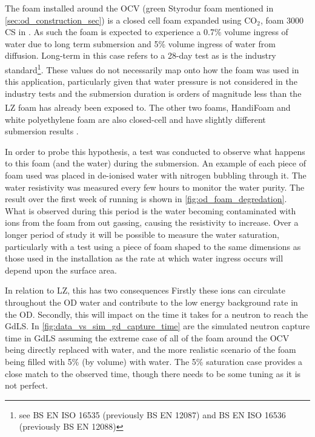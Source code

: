 \par
The foam installed around the OCV (green Styrodur foam mentioned in \autoref{sec:od_construction_sec}) is a closed cell foam expanded using CO$_2$, foam 3000 CS in \cite{styrodur_water_ingress_ref}.
As such the foam is expected to experience a 0.7\% volume ingress of water due to long term submersion and 5\% volume ingress of water from diffusion.
Long-term in this case refers to a 28-day test as is the industry standard\footnote{see BS EN ISO 16535 (previously BS EN 12087) and BS EN ISO 16536 (previously BS EN 12088)}.
These values do not necessarily map onto how the foam was used in this application, particularly given that water pressure is not considered in the industry tests and the submersion duration is orders of magnitude less than the LZ foam has already been exposed to.
The other two foams, HandiFoam\textsuperscript{\textregistered} and white polyethylene foam are also closed-cell and have slightly different submersion results
\cite{handifoam_water_ingress_ref, white_foam_ref}. 
\par
In order to probe this hypothesis, a test was conducted to observe what happens to this foam (and the water) during the submersion.
An example of each piece of foam used was placed in de-ionised water with nitrogen bubbling through it. 
The water resistivity was measured every few hours to monitor the water purity.
The result over the first week of running is shown in \autoref{fig:od_foam_degredation}.
What is observed during this period is the water becoming contaminated with ions from the foam from out gassing, causing the resistivity to increase.
Over a longer period of study it will be possible to measure the water saturation, particularly with a test using a piece of foam shaped to the same dimensions as those used in the installation as the rate at which water ingress occurs will depend upon the surface area.
\par
In relation to LZ, this has two consequences
Firstly these ions can circulate throughout the OD water and contribute to the low energy background rate in the OD.
Secondly, this will impact on the time it takes for a neutron to reach the GdLS.
In \autoref{fig:data_vs_sim_gd_capture_time} are the simulated neutron capture time in GdLS assuming the extreme case of all of the foam around the OCV being directly replaced with water, and the more realistic scenario of the foam being filled with 5\% (by volume) with water.
The 5\% saturation case provides a close match to the observed time, though there needs to be some tuning as it is not perfect.

